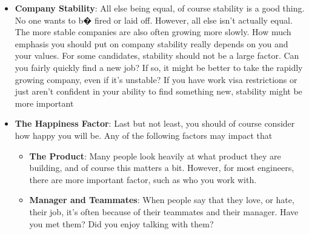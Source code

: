 \documentclass{report}
\begin{document}
\begin{itemize}
            \begin{itemize}
                \item How good does the company's name look on my resume?
                \item How much will I learn? Will I learn relevant things?
                \item What is the promotion plan? How do the careers of developers progress?
                \item If I want to move into management, does this company offer a realistic plan?
                \item Is the company or team growing?
                \item If I do want to leave the company, is it situated near other companies I'm interested in, or will I need to move?
            \end{itemize}
            The final point is extremely important and usually overlooked. If you only have a few other companies to pick from in your city, your career options will be more restricted. Fewer options means that you're less likely to discover really great opportunities.
        \item \textbf{Company Stability}: All else being equal, of course stability is a good thing. No one wants to b� fired or laid off.
            \bigbreak \noindent 
            However, all else isn't actually equal. The more stable companies are also often growing more slowly.
            \bigbreak \noindent 
            How much emphasis you should put on company stability really depends on you and your values. For some candidates, stability should not be a large factor. Can you fairly quickly find a new job? If so, it might be better to take the rapidly growing company, even if it's unstable? If you have work visa restrictions or just aren't confident in your ability to find something new, stability might be more important
        \item \textbf{The Happiness Factor}: Last but not least, you should of course consider how happy you will be. Any of the following factors may impact that
            \begin{itemize}
                \item \textbf{The Product}: Many people look heavily at what product they are building, and of course this matters a bit. However, for most engineers, there are more important factor, such as who you work with.
                \item \textbf{Manager and Teammates}: When people say that they love, or hate, their job, it's often because of their teammates and their manager. Have you met them? Did you enjoy talking with them?

\end{itemize}
\end{itemize}
\end{document}
